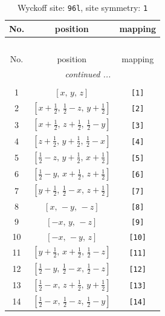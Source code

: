 \documentclass[fleqn,8pt]{jsarticle}
\begin{document}
\begin{longtable}{ccc}
\caption{Wyckoff site: {\tt 96l}, site symmetry: {\tt 1}}
 \\
 \hline \hline
No. & position & mapping \\ \hline \endfirsthead

\multicolumn{2}{l}{\tablename\ \thetable{}} \\
 \hline \hline
No. & position & mapping \\ \hline \endhead

 \hline \hline
\multicolumn{2}{r}{\footnotesize\it continued ...} \\ \endfoot

 \hline \hline
\multicolumn{2}{r}{} \\ \endlastfoot

1 & $\left[ x,\, y,\, z \right]$ & {\tt [1]} \\ \hline
2 & $\left[ x + \frac{1}{2},\, \frac{1}{2} - z,\, y + \frac{1}{2} \right]$ & {\tt [2]} \\ \hline
3 & $\left[ x + \frac{1}{2},\, z + \frac{1}{2},\, \frac{1}{2} - y \right]$ & {\tt [3]} \\ \hline
4 & $\left[ z + \frac{1}{2},\, y + \frac{1}{2},\, \frac{1}{2} - x \right]$ & {\tt [4]} \\ \hline
5 & $\left[ \frac{1}{2} - z,\, y + \frac{1}{2},\, x + \frac{1}{2} \right]$ & {\tt [5]} \\ \hline
6 & $\left[ \frac{1}{2} - y,\, x + \frac{1}{2},\, z + \frac{1}{2} \right]$ & {\tt [6]} \\ \hline
7 & $\left[ y + \frac{1}{2},\, \frac{1}{2} - x,\, z + \frac{1}{2} \right]$ & {\tt [7]} \\ \hline
8 & $\left[ x,\, - y,\, - z \right]$ & {\tt [8]} \\ \hline
9 & $\left[ - x,\, y,\, - z \right]$ & {\tt [9]} \\ \hline
10 & $\left[ - x,\, - y,\, z \right]$ & {\tt [10]} \\ \hline
11 & $\left[ y + \frac{1}{2},\, x + \frac{1}{2},\, \frac{1}{2} - z \right]$ & {\tt [11]} \\ \hline
12 & $\left[ \frac{1}{2} - y,\, \frac{1}{2} - x,\, \frac{1}{2} - z \right]$ & {\tt [12]} \\ \hline
13 & $\left[ \frac{1}{2} - x,\, z + \frac{1}{2},\, y + \frac{1}{2} \right]$ & {\tt [13]} \\ \hline
14 & $\left[ \frac{1}{2} - x,\, \frac{1}{2} - z,\, \frac{1}{2} - y \right]$ & {\tt [14]} \\ \hline

\end{longtable}
\end{document}
